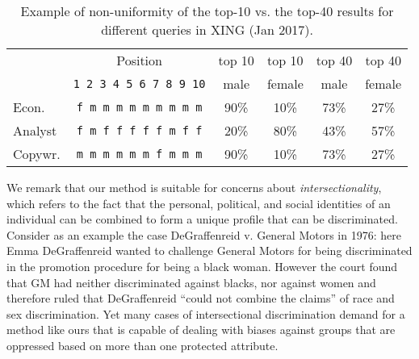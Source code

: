 \begin{table}[t]
	\caption{Example of non-uniformity of the top-10 vs. the top-40 results for different queries in XING (Jan 2017).
		\label{tbl:xing_intro_example}}

	\centering\small\begin{tabular}{lccccc}\toprule
		& Position					  & top 10 & top 10  & top 40 & top 40 \\
		& \texttt{1 2 3 4 5 6 7 8 9 10} & male & female & male & female \\
		\midrule
		Econ.  & \texttt{f m m m m m m m m m} & 90\% & 10\% & 73\% & 27\% \\
		Analyst& \texttt{f m f f f f f m f f} & 20\% & 80\% & 43\% & 57\% \\
		Copywr.& \texttt{m m m m m m f m m m} & 90\% & 10\% & 73\% & 27\% \\
		\bottomrule
	\end{tabular}


\end{table}




We remark that our method is suitable for concerns about \emph{intersectionality}, which refers to the fact that \textcolor[rgb]{0.00,0.00,1.00}{the personal}, political, and social identities \textcolor[rgb]{0.00,0.00,1.00}{of an individual can be combined to form a unique profile that can be discriminated}.
%
Consider as an example the case DeGraffenreid v. General Motors in 1976: here Emma DeGraffenreid wanted to challenge General Motors for being discriminated in the promotion procedure for being a black woman.
%
However the court found that GM had neither discriminated against blacks, nor against women and therefore ruled that DeGraffenreid ``could not combine the claims'' of race and sex discrimination.
%
Yet many cases of intersectional discrimination demand for a method like ours that is capable of dealing with biases against groups that are oppressed based on more than one protected \textcolor[rgb]{0.00,0.00,1.00}{attribute}.

